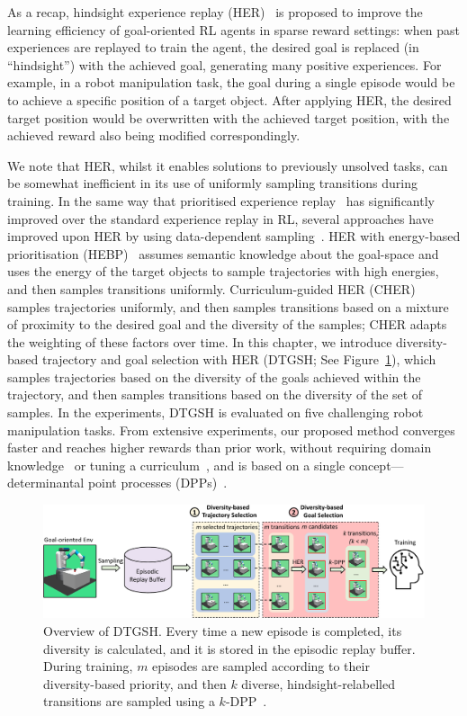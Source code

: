As a recap, hindsight experience replay (HER)~\cite{andrychowicz2017hindsight} is proposed to improve the learning efficiency of goal-oriented RL agents in sparse reward settings: when past experiences are replayed to train the agent, the desired goal is replaced (in ``hindsight'') with the achieved goal, generating many positive experiences. For example, in a robot manipulation task, the goal during a single episode would be to achieve a specific position of a target object. After applying HER, the desired target position would be overwritten with the achieved target position, with the achieved reward also being modified correspondingly.

We note that HER, whilst it enables solutions to previously unsolved tasks, can be somewhat inefficient in its use of uniformly sampling transitions during training. In the same way that prioritised experience replay~\cite{schaul2016prioritized} has significantly improved over the standard experience replay in RL, several approaches have improved upon HER by using data-dependent sampling~\cite{fang2019curriculum,zhao2018energy}. HER with energy-based prioritisation (HEBP)~\cite{zhao2018energy} assumes semantic knowledge about the goal-space and uses the energy of the target objects to sample trajectories with high energies, and then samples transitions uniformly. Curriculum-guided HER (CHER)~\cite{fang2019curriculum} samples trajectories uniformly, and then samples transitions based on a mixture of proximity to the desired goal and the diversity of the samples; CHER adapts the weighting of these factors over time. In this chapter, we introduce diversity-based trajectory and goal selection with HER (DTGSH; See Figure~\ref{fig:illustration_c4}), which samples trajectories based on the diversity of the goals achieved within the trajectory, and then samples transitions based on the diversity of the set of samples. In the experiments, DTGSH is evaluated on five challenging robot manipulation tasks. From extensive experiments, our proposed method converges faster and reaches higher rewards than prior work, without requiring domain knowledge~\cite{zhao2018energy} or tuning a curriculum~\cite{fang2019curriculum}, and is based on a single concept---determinantal point processes (DPPs)~\cite{kulesza2012determinantal}.
\begin{figure}[h]
    \centering
    \includegraphics[width=\textwidth]{figures/chapter4/illustration_DTGSH_latest.pdf}
    \caption{Overview of DTGSH. Every time a new episode is completed, its diversity is calculated, and it is stored in the episodic replay buffer. During training, $m$ episodes are sampled according to their diversity-based priority, and then $k$ diverse, hindsight-relabelled transitions are sampled using a $k$-DPP~\cite{kulesza2011k}.}
    \label{fig:illustration_c4}
\end{figure}


